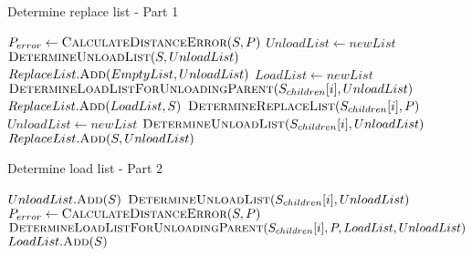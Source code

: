 \begin{algorithm}[h]
\caption{Determine replace list - Part 1}\label{alg:DeterminLoadList}
\begin{algorithmic}[1]
    \State $P_{error} \gets \Call{CalculateDistanceError}{S, P}$
     
        \State $UnloadList \gets newList$
        \State $\Call{DetermineUnloadList}{S, UnloadList}$
            \State $ReplaceList.\Call{Add}{EmptyList, UnloadList}$
        \EndIf
     
            \State $LoadList \gets newList$
                \State $\Call{DetermineLoadListForUnloadingParent}{S_{children}[i], UnloadList}$
            \EndFor
            \State $ReplaceList.\Call{Add}{LoadList, S}$
        \Else
                \State $\Call{DetermineReplaceList}{S_{children}[i], P}$
            \EndFor
        \EndIf
    \Else {}
            \State $UnloadList \gets newList$
                \State $\Call{DetermineUnloadList}{S_{children}[i], UnloadList}$
            \EndFor
            \State $ReplaceList.\Call{Add}{S, UnloadList}$
        \EndIf
    \EndIf
\EndProcedure
{}
\end{algorithmic}
\end{algorithm}

\begin{algorithm}[h]
\caption{Determine load list - Part 2}
\begin{algorithmic}[1]
        \State $UnloadList.\Call{Add}{S}$
    \EndIf
        \State $\Call{DetermineUnloadList}{S_{children}[i], UnloadList}$
    \EndFor
\EndFunction
{}
    \State $P_{error} \gets \Call{CalculateDistanceError}{S, P}$
     
        \State {}
     
            \State $\Call{DetermineLoadListForUnloadingParent}{S_{children}[i], P, LoadList, UnloadList}$
        \EndFor
    \Else
        \State $LoadList.\Call{Add}{S}$
    \EndIf
\EndFunction
\end{algorithmic}
\end{algorithm}

